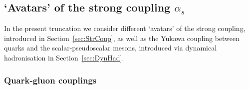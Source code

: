 \documentclass[%
reprint,
superscriptaddress,
showpacs,preprintnumbers,
 amsmath,amssymb,
 aps,
prd,
]{revtex4-1}
\def\sec#1{Section~\ref{#1}}
\begin{document}

\subsection{`Avatars' of the strong coupling $\alpha_s$}
\label{sec:vertices}

In the present truncation we consider different `avatars' of the
strong coupling, introduced in \sec{sec:StrCoup}, as well as the
Yukawa coupling between quarks and the scalar-pseudoscalar mesons,
introduced via dynamical hadronisation in \sec{sec:DynHad}.


\subsubsection{Quark-gluon couplings}\label{sec:QuarkGluon}
\end{document}
